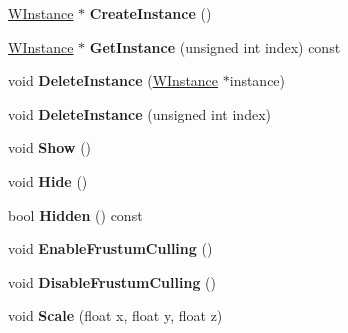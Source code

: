 \begin{DoxyCompactItemize}
\item 
\hyperlink{class_w_instance}{W\+Instance} $\ast$ {\bfseries Create\+Instance} ()\hypertarget{class_w_object_acb0daac5850075a54b012703bab0b589}{}\label{class_w_object_acb0daac5850075a54b012703bab0b589}

\item 
\hyperlink{class_w_instance}{W\+Instance} $\ast$ {\bfseries Get\+Instance} (unsigned int index) const \hypertarget{class_w_object_a144ebe9b2effa5355d3e5c243d871ced}{}\label{class_w_object_a144ebe9b2effa5355d3e5c243d871ced}

\item 
void {\bfseries Delete\+Instance} (\hyperlink{class_w_instance}{W\+Instance} $\ast$instance)\hypertarget{class_w_object_ad408d0bc44bbcc7deabfd979caad3edd}{}\label{class_w_object_ad408d0bc44bbcc7deabfd979caad3edd}

\item 
void {\bfseries Delete\+Instance} (unsigned int index)\hypertarget{class_w_object_a8f7264e7168585f60d82f6183fa35e5e}{}\label{class_w_object_a8f7264e7168585f60d82f6183fa35e5e}

\item 
void {\bfseries Show} ()\hypertarget{class_w_object_a2f1ca8ef071fb6c259502555d6b5a47c}{}\label{class_w_object_a2f1ca8ef071fb6c259502555d6b5a47c}

\item 
void {\bfseries Hide} ()\hypertarget{class_w_object_a72a9f879a85cf26d72548ffc8835ad67}{}\label{class_w_object_a72a9f879a85cf26d72548ffc8835ad67}

\item 
bool {\bfseries Hidden} () const \hypertarget{class_w_object_a83f2fef49f037cac8a26f966174ecdcc}{}\label{class_w_object_a83f2fef49f037cac8a26f966174ecdcc}

\item 
void {\bfseries Enable\+Frustum\+Culling} ()\hypertarget{class_w_object_a50ad933e853950919c8742bf12bc90e8}{}\label{class_w_object_a50ad933e853950919c8742bf12bc90e8}

\item 
void {\bfseries Disable\+Frustum\+Culling} ()\hypertarget{class_w_object_a15a2fef8f1ebf38e8aeee70eabbf79b8}{}\label{class_w_object_a15a2fef8f1ebf38e8aeee70eabbf79b8}

\item 
void {\bfseries Scale} (float x, float y, float z)\hypertarget{class_w_object_a1dcebfccb9dda3a0eb0f08594834eca7}{}\label{class_w_object_a1dcebfccb9dda3a0eb0f08594834eca7}


\end{DoxyCompactItemize}
